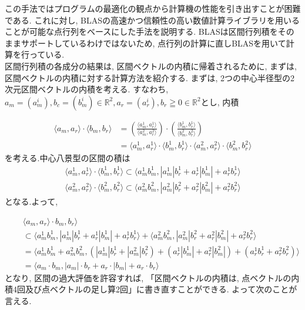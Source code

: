\documentclass[11pt,a4paper]{jsreport}
\theoremstyle{definition}
\begin{document}
この手法ではプログラムの最適化の観点から計算機の性能を引き出すことが困難である. これに対し, BLASの高速かつ信頼性の高い数値計算ライブラリを用いることが可能な点行列をベースにした手法を説明する. BLASは区間行列積をそのままサポートしているわけではないため, 点行列の計算に直しBLASを用いて計算を行っている. \\
\indent	区間行列積の各成分の結果は, 区間ベクトルの内積に帰着されるために, まずは, 区間ベクトルの内積に対する計算方法を紹介する.
\indent まずは, 2つの中心半径型の2次元区間ベクトルの内積を考える. すなわち, $a_m = (a_m^i),b_c = (b_m^i) \in \mathbb{R}^2,a_r = (a_r^i),b_r \geqq 0 \in \mathbb{R}^2$とし, 内積

\begin{align*}
\langle a_m,a_r \rangle \cdot \langle b_m,b_r \rangle &= \left(\frac{\langle a_m^1,a_r^1 \rangle}{\langle a_m^2,a_r^2 \rangle} \right) \cdot \left(\frac{\langle b_m^1,b_r^1 \rangle}{\langle b_m^2,b_r^2 \rangle} \right) \\
&=\langle a_m^1,a_r^1 \rangle \cdot \langle b_m^1,b_r^1 \rangle \cdot \langle a_m^2,a_r^2 \rangle \cdot \langle b_m^2,b_r^2 \rangle
\end{align*}
\noindent を考える.中心八景型の区間の積は
\begin{align*}
\langle a_m^1,a_r^1 \rangle \cdot \langle b_m^1,b_r^1 \rangle \subset \langle a_m^1b_m^1, | a_m^1|b_r^1 + a_r^1|b_m^1| + a_r^1b_r^1 \rangle \\
\langle a_m^2,a_r^2 \rangle \cdot \langle b_m^2,b_r^2 \rangle \subset \langle a_m^2b_m^2, | a_m^2|b_r^2 + a_r^2|b_m^2| + a_r^2b_r^2 \rangle
\end{align*}
\noindent となる.よって,

\begin{align*}
\quad &\langle a_m,a_r \rangle \cdot b_m,b_r \rangle \\
&\subset \langle a_m^1b_m^1, | a_m^1|b_r^1 + a_r^1|b_m^1| + a_r^1b_r^1 \rangle + \langle a_m^2b_m^2, | a_m^2|b_r^2 + a_r^2|b_m^2| + a_r^2b_r^2 \rangle \\
&=\langle a_m^1b_m^1 + a_m^2b_m^2, (|a_m^1|b_r^1 + |a_m^2|b_r^2) + (a_r^1|b_m^1| + a_r^2|b_m^2|) + (a_r^1b_r^1 + a_r^2b_r^2) \rangle \\
&= \langle a_m \cdot b_m, |a_m| \cdot b_r + a_r \cdot |b_m| + a_r \cdot b_r \rangle
\end{align*}
\noindent となり, 区間の過大評価を許容すれば, 「区間ベクトルの内積は, 点ベクトルの内積4回及び点ベクトルの足し算2回」に書き直すことができる.
\indent よって次のことが言える.
\end{document}
